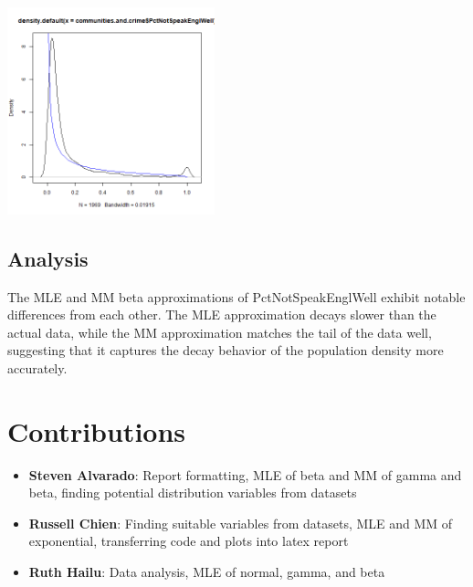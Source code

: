 \documentclass[12pt, letterpaper]{report}
\begin{document}
\begin{center}
\includegraphics[width=0.45\textwidth]{beta/PctNotSpeakEnglWell_mm}
\end{center}

\section{Analysis}
The MLE and MM beta approximations of PctNotSpeakEnglWell exhibit notable differences from each other.
The MLE approximation decays slower than the actual data, while the MM approximation matches the tail of the data well, suggesting that it captures the decay behavior of the population density more accurately.



\chapter{Contributions}
\begin{itemize}
 \item \textbf{Steven Alvarado}: Report formatting, MLE of beta and MM of gamma and beta, finding potential distribution variables from datasets
 \item \textbf{Russell Chien}: Finding suitable variables from datasets, MLE and MM of exponential, transferring code and plots into latex report
 \item \textbf{Ruth Hailu}: Data analysis, MLE of normal, gamma, and beta
\end{itemize}
\end{document}
